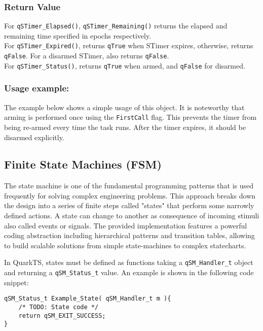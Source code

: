 \subsubsection*{Return Value}
For \lstinline{qSTimer_Elapsed()}, \lstinline{qSTimer_Remaining()} returns the elapsed and remaining time specified in epochs respectively. \\
For \lstinline{qSTimer_Expired()}, returns \lstinline{qTrue} when STimer expires, otherwise, returns \lstinline{qFalse}. For a disarmed STimer, also returns \lstinline{qFalse}. \\
For \lstinline{qSTimer_Status()}, returns \lstinline{qTrue} when armed, and \lstinline{qFalse} for disarmed.

\noindent\hrulefill

\subsubsection*{Usage example:}
The example below shows a simple usage of this object. It is noteworthy that arming is performed once using the \lstinline{FirstCall} flag. This prevents the timer from being re-armed every time the task runs. After the timer expires, it should be disarmed explicitly.
\medskip




\subsection{Finite State Machines (FSM)}
The state machine is one of the fundamental programming patterns that is used frequently for solving complex engineering problems. This approach breaks down the design into a series of finite steps called "states" that perform some narrowly defined actions. A state can change to another as consequence of incoming stimuli also called events or signals. 
The provided implementation features a powerful coding abstraction including hierarchical patterns and transition tables, allowing to build scalable solutions from simple state-machines to complex statecharts. 

In QuarkTS, states must be defined as functions taking a \lstinline{qSM_Handler_t} object and returning a \lstinline{qSM_Status_t} value. An example is shown in the following code snippet:
\medskip

\begin{lstlisting}[style=CStyle]
qSM_Status_t Example_State( qSM_Handler_t m ){
    /* TODO: State code */
    return qSM_EXIT_SUCCESS;
}
\end{lstlisting}    


